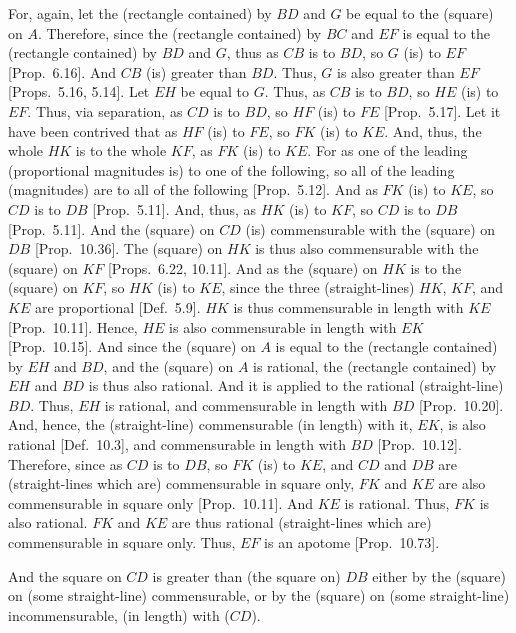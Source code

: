 \begin{Parallel}{}{}
{For, again, let the (rectangle contained) by $BD$ and $G$  be equal
to the (square) on $A$. Therefore, since the (rectangle contained) by $BC$
and $EF$ is equal to the (rectangle contained) by $BD$ and $G$, thus as
$CB$ is to $BD$, so $G$ (is) to $EF$ [Prop.~6.16].
And $CB$ (is) greater than $BD$. Thus, $G$ is also greater than $EF$
[Props.~5.16, 5.14].
Let $EH$ be equal to $G$. Thus, as $CB$ is to $BD$, so $HE$
(is) to $EF$. Thus, via separation, as $CD$ is to $BD$, so $HF$ (is) to $FE$
[Prop.~5.17]. Let it have been contrived that as
$HF$ (is) to $FE$, so $FK$ (is) to $KE$. And, thus, the
whole $HK$ is to the whole $KF$, as $FK$ (is) to $KE$.
For as one of the leading (proportional magnitudes is) to one of
the following, so all of the leading (magnitudes) are to all of the
following [Prop.~5.12]. And as $FK$
(is) to $KE$, so $CD$ is to $DB$ [Prop.~5.11].  And, thus, as $HK$ (is) to $KF$, so
$CD$ is to $DB$ [Prop.~5.11].
And the (square) on  $CD$ (is) 
 commensurable with the (square) on $DB$ [Prop.~10.36]. The (square) on $HK$ is
 thus also commensurable with the (square) on $KF$ [Props.~6.22, 10.11].
  And as the (square) on $HK$ is to the (square) on $KF$, so $HK$ (is)
  to $KE$, since the three (straight-lines) $HK$, $KF$, and $KE$ are
  proportional [Def.~5.9]. $HK$ is thus commensurable
  in length with $KE$ [Prop.~10.11]. 
  Hence, $HE$ is also commensurable in length with $EK$
  [Prop.~10.15]. And since the (square) on $A$
  is equal to the (rectangle contained) by $EH$ and $BD$, and the (square)
  on $A$ is rational, the (rectangle contained) by $EH$ and $BD$ is thus
  also rational. And it is applied to the rational (straight-line) $BD$.
  Thus, $EH$ is  rational, and commensurable in length with $BD$ [Prop.~10.20]. And, hence, the (straight-line)
  commensurable (in length) with it, $EK$, is also rational [Def.~10.3], and commensurable
  in length with $BD$ [Prop.~10.12].  Therefore,
  since as $CD$  is to $DB$, so $FK$ (is) to $KE$, and $CD$ and $DB$
  are (straight-lines which are) commensurable in square only, $FK$ and $KE$ are also
  commensurable in square only [Prop.~10.11]. 
  And $KE$ is rational. Thus, $FK$ is also rational. $FK$ and
  $KE$ are thus rational (straight-lines which are) commensurable in square
  only. Thus, $EF$ is an apotome [Prop.~10.73].
  
  And the square on $CD$ is greater than (the square on) $DB$ either
  by the (square) on (some straight-line) commensurable, or by the
  (square) on (some straight-line) incommensurable, (in length) with ($CD$).
  
}
\end{Parallel}
